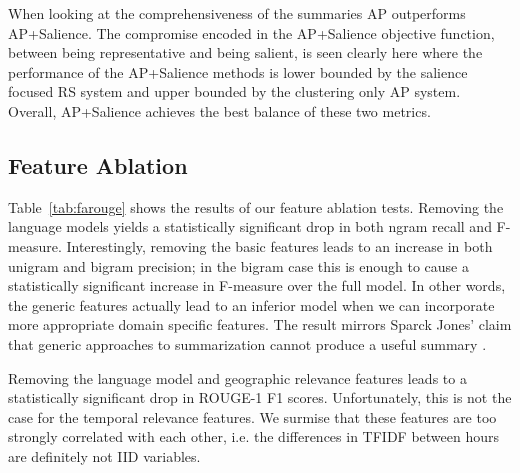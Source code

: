 When looking at the comprehensiveness of the summaries AP outperforms
 AP+Salience. The compromise encoded in the AP+Salience objective
function, between being representative and being salient, is seen clearly here
where the performance of the AP+Salience methods is lower bounded by 
the salience focused RS
system and upper bounded by the clustering only AP system.
Overall, AP+Salience achieves the best balance of these two metrics.



\subsection{Feature Ablation}


Table~\ref{tab:farouge} shows the results of our feature ablation
tests. Removing the language models yields a statistically 
significant drop in both ngram recall and F-measure. 
Interestingly, removing the basic features leads to an
increase in both unigram and bigram precision; in the bigram
case this is enough to cause a statistically significant increase
in F-measure over the full model. In other words, the generic features
actually lead to an inferior model when we can incorporate more appropriate
domain specific features.
The result mirrors Sparck Jones' claim that generic approaches to summarization cannot produce a useful summary \cite{ksj98}.

Removing the language model and geographic relevance features leads to a
statistically significant drop in ROUGE-1 F1 scores. Unfortunately,
this is not the case for the temporal relevance features. We surmise that
these features are too strongly correlated with each other, 
i.e. the differences in TFIDF between hours are definitely not IID variables. 




